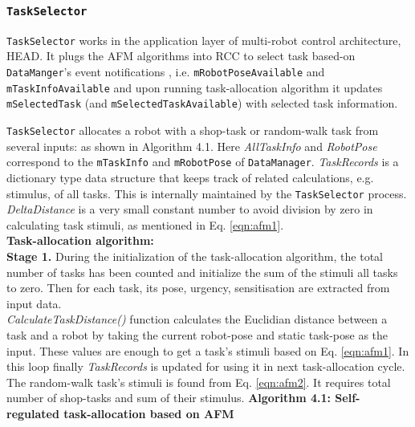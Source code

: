 \subsubsection*{\texttt{TaskSelector}}
\texttt{TaskSelector} works in the application layer of multi-robot control architecture, HEAD. It plugs the AFM algorithms into RCC to select task based-on\\ \texttt{DataManger}'s event notifications , i.e. \texttt{mRobotPoseAvailable} and\\ \texttt{mTaskInfoAvailable} and upon running task-allocation algorithm it updates  \texttt{mSelectedTask} (and \texttt{mSelectedTaskAvailable}) with selected task information.

\texttt{TaskSelector}  allocates a robot with a shop-task or random-walk task from several inputs: as shown in Algorithm 4.1. Here  \textit{AllTaskInfo} and \textit{RobotPose} correspond to the \texttt{mTaskInfo} and \texttt{mRobotPose} of \texttt{DataManager}. \textit{TaskRecords} is a dictionary type data structure that keeps track of related calculations, e.g. stimulus, of all tasks. This is internally maintained by the \texttt{TaskSelector} process.  \textit{DeltaDistance} is a very small constant number to avoid division by zero in calculating task stimuli, as mentioned in Eq. \ref{eqn:afm1}.\\
\textbf{Task-allocation algorithm:}\\
\textbf{Stage 1.} During the initialization of the task-allocation algorithm, the total number of tasks has been counted and initialize the sum of the stimuli all tasks to zero. Then for each task, its pose, urgency, sensitisation are extracted from input data.\\  \textit{CalculateTaskDistance()} function calculates the Euclidian distance between a task and a robot by taking the current robot-pose and static task-pose as the input. These values are enough to get a task's stimuli based on Eq. \ref{eqn:afm1}. In this loop finally  \textit{TaskRecords} is updated for using it in next task-allocation cycle. The random-walk task's stimuli is found from Eq. \ref{eqn:afm2}. It requires total number of shop-tasks and sum of their stimulus.
\newline
\textbf{Algorithm 4.1: Self-regulated task-allocation based on AFM}
\vspace{-3mm}
\newline
\HRule
